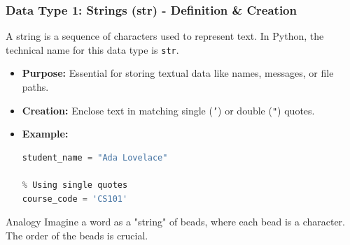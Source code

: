 \documentclass{beamer}
\begin{document}
\begin{frame}[fragile]
    \frametitle{Data Type 1: Strings (str) - Definition \& Creation}
    
    A string is a sequence of characters used to represent text. In Python, the technical name for this data type is \texttt{str}.
    
    \begin{itemize}
        \item \textbf{Purpose:} Essential for storing textual data like names, messages, or file paths.
        
        \item \textbf{Creation:} Enclose text in matching single (\texttt{'}) or double (\texttt{"}) quotes.
        
        \item \textbf{Example:}
        \begin{lstlisting}[language=Python]
% Using double quotes
student_name = "Ada Lovelace"

% Using single quotes
course_code = 'CS101'
        \end{lstlisting}
    \end{itemize}
    
    \begin{block}{Analogy}
        Imagine a word as a "string" of beads, where each bead is a character. The order of the beads is crucial.
    \end{block}
    
\end{frame}
\end{document}

